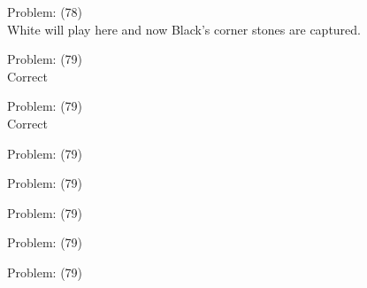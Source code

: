 \documentclass[11pt]{article}
\begin{document}
\begin{minipage}[t]{0.5\textwidth}
  {\centering
  
Problem: (78)\\
White will play here and now Black's corner stones are captured.\\
  }
\end{minipage}
\begin{minipage}[t]{0.5\textwidth}
  {\centering
  
Problem: (79)\\
Correct\\
  }
\end{minipage}
\begin{minipage}[t]{0.5\textwidth}
  {\centering
  
Problem: (79)\\
Correct\\
  }
\end{minipage}
\begin{minipage}[t]{0.5\textwidth}
  {\centering
  
Problem: (79)\\
  }
\end{minipage}
\begin{minipage}[t]{0.5\textwidth}
  {\centering
  
Problem: (79)\\
  }
\end{minipage}
\begin{minipage}[t]{0.5\textwidth}
  {\centering
  
Problem: (79)\\
  }
\end{minipage}
\begin{minipage}[t]{0.5\textwidth}
  {\centering
  
Problem: (79)\\
  }
\end{minipage}
\begin{minipage}[t]{0.5\textwidth}
  {\centering
  
Problem: (79)\\
  }
\end{minipage}
\end{document}

